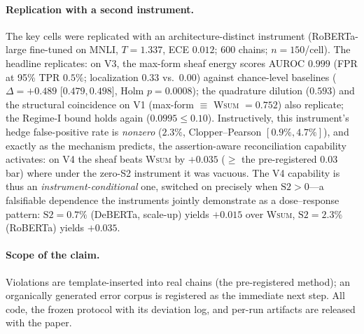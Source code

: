 \paragraph{Replication with a second instrument.} The key cells were
replicated with an architecture-distinct instrument
(RoBERTa-large \cite{liu2019} fine-tuned on MNLI, $T=1.337$, ECE $0.012$;
600 chains; $n=150$/cell). The
headline replicates: on V3, the max-form sheaf energy scores AUROC
$\mathbf{0.999}$ (FPR at 95\% TPR $0.5\%$; localization $0.33$ vs.\ $0.00$)
against chance-level baselines ($\Delta=+0.489$ [$0.479,0.498$], Holm
$p=0.0008$); the quadrature dilution ($0.593$) and the structural coincidence
on V1 (max-form $\equiv$ \textsc{Wsum} $=0.752$) also replicate; the
Regime-I bound holds again ($0.0995\le 0.10$). Instructively, this
instrument's hedge false-positive rate is \emph{nonzero} ($2.3\%$,
Clopper--Pearson $[0.9\%,4.7\%]$), and exactly as the mechanism predicts, the
assertion-aware reconciliation capability activates: on V4 the sheaf beats
\textsc{Wsum} by $+0.035$ ($\ge$ the pre-registered $0.03$ bar) where under
the zero-S2 instrument it was vacuous. The V4 capability is thus an
\emph{instrument-conditional} one, switched on precisely when
$\mathrm{S2}>0$---a falsifiable dependence the instruments jointly
demonstrate as a dose--response pattern: $\mathrm{S2}=0.7\%$ (DeBERTa,
scale-up) yields $+0.015$ over \textsc{Wsum}, $\mathrm{S2}=2.3\%$ (RoBERTa)
yields $+0.035$.

\paragraph{Scope of the claim.} Violations are template-inserted into real
chains (the pre-registered method); an organically generated error corpus is
registered as the immediate next step. All code, the frozen protocol with its
deviation log, and per-run artifacts are released with the paper.
